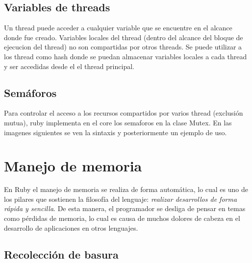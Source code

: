 \documentclass{article}
\begin{document}
\subsection{Variables de threads}
Un thread puede acceder a cualquier variable que se encuentre en el alcance donde fue creado. Variables locales del thread (dentro del alcance del bloque de ejecucion del thread) no son compartidas por otros threads. Se puede utilizar a los thread como hash donde se puedan almacenar variables locales a cada thread y ser accedidas desde el el thread principal.

 
\bigskip


\subsection{Semáforos}

Para controlar el acceso a los recursos compartidos por varios thread (exclusión mutua), ruby implementa en el core los semaforos en la clase Mutex. En las imagenes siguientes se ven la sintaxis y posteriormente un ejemplo de uso.

 
\bigskip

 
\bigskip




\section{Manejo de memoria}

	En Ruby el manejo de memoria se realiza de forma automática, lo cual es uno de los pilares que sostienen la filosofía del lenguaje: \textit{realizar desarrollos de forma rápida y sencilla}. De esta manera, el programador se desliga de pensar en temas como pérdidas de memoria, lo cual es causa de muchos dolores de cabeza en el desarrollo de aplicaciones en otros lenguajes.


\subsection{Recolección de basura}
\end{document}
